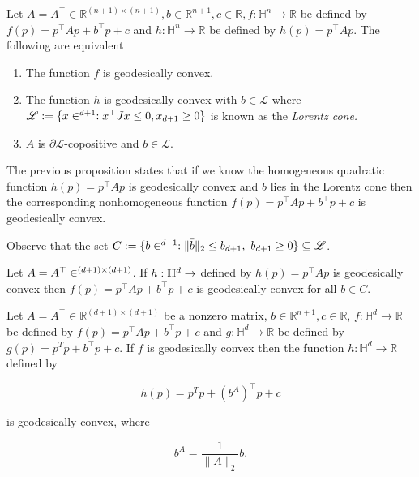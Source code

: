 \documentclass[twoside,11pt]{article}
\begin{document}
\begin{prop}\label{prop:nonhom_hom}
    Let $A=A^{\top} \in \mathbb{R}^{(n+1) \times(n+1)}, b \in \mathbb{R}^{n+1}, c \in \mathbb{R}, f: \mathbb{H}^n \rightarrow \mathbb{R}$ be defined by $f(p)=p^{\top} A p+b^{\top} p+c$ and $h: \mathbb{H}^n \rightarrow \mathbb{R}$ be defined by $h(p)=p^{\top} A p$. The following are equivalent
    \begin{enumerate}
        \item \text The function $f$ is geodesically convex.
        \item The function $h$ is geodesically convex with $b \in \mathscr{L}$ where $\mathscr{L} := \{x \in \real^{d+1}: x^\top J x \leq 0, x_{d+1} \geq 0\}$ is known as the \emph{Lorentz cone.}
        \item  $A$ is $\partial \mathscr{L}$-copositive and $b \in \mathscr{L}$.
    \end{enumerate}
\end{prop}

The previous proposition states that if we know the homogeneous quadratic function $h(p) = p^\top A p$ is geodesically convex and $b$ lies in the Lorentz cone then the corresponding nonhomogeneous function $f(p) = p^\top A p + b^\top p + c$ is geodesically convex.


\begin{example}\label{ex:lorentz_cone_set}
    Observe that the set $C := \{b \in \real^{d+1} : \|\bar{b}\|_2 \leq b_{d+1}, \ b_{d+1} \geq 0\} \subseteq \mathscr{L}$. 
    
    Let $A = A^\top \in \real^{(d+1) \times (d+1)}$.  If $h:\mathbb{H}^d \to \real$ defined by $h(p) = p^\top A p$ is geodesically convex then $f(p) = p^\top A p + b^\top p + c$ is geodesically convex for all $b \in C$.
\end{example}


\begin{prop}
Let $A=A^{\top} \in \mathbb{R}^{(d+1) \times(d+1)}$ be a nonzero matrix, $b \in \mathbb{R}^{n+1}, c \in \mathbb{R}$, $f: \mathbb{H}^d \rightarrow \mathbb{R}$ be defined by $f(p)=p^{\top} A p+b^{\top} p+c$ and $g: \mathbb{H}^d \rightarrow \mathbb{R}$ be defined by $g(p)=p^T p+b^{\top} p+c$. If $f$ is geodesically convex then the function $h: \mathbb{H}^d \rightarrow \mathbb{R}$ defined by

$$
h(p)=p^T p+\left(b^A\right)^{\top} p+c
$$

is geodesically convex, where

$$
b^A=\frac{1}{\|A\|_2} b .
$$

\end{prop}
\end{document}
